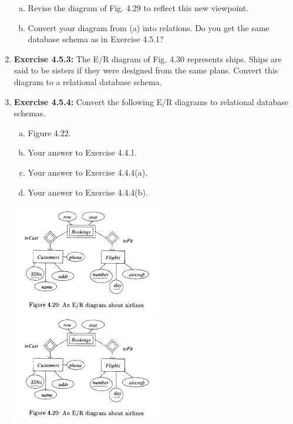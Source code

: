\documentclass[12pt]{article}
\begin{document}
\begin{enumerate}[1.]
    \bigskip

    \begin{enumerate}[a)]
        \item Revise the diagram of Fig. 4.29 to reflect this new viewpoint.
        \item Convert your diagram from (a) into relations. Do you get the same database schema as in Exercise 4.5.1?
    \end{enumerate}

    \item \textbf{Exercise 4.5.3:} The E/R diagram of Fig. 4.30 represents ships. Ships are said
    to be sisters if they were designed from the same plans. Convert this diagram
    to a relational database schema.

    \item \textbf{Exercise 4.5.4:} Convert the following E/R diagrams to relational database
    schemas.

    \begin{enumerate}[a)]
        \item Figure 4.22.
        \item Your answer to Exercise 4.4.1.
        \item Your answer to Exercise 4.4.4(a).
        \item Your answer to Exercise 4.4.4(b).
    \end{enumerate}

    \begin{center}
    \includegraphics[width=0.7\linewidth]{images/worksheet_14_3.png}
    \includegraphics[width=0.7\linewidth]{images/worksheet_14_4.png}
    \end{center}


\end{enumerate}
\end{document}
